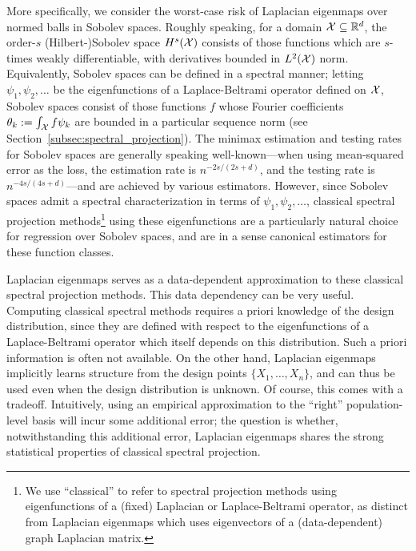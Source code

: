 More specifically, we consider the worst-case risk of Laplacian eigenmaps over normed balls in Sobolev spaces. Roughly speaking, for a domain $\mathcal{X} \subseteq \mathbb{R}^d$, the order-$s$ (Hilbert-)Sobolev space $H^s(\mathcal{X})$ consists of those functions which are $s$-times weakly differentiable, with derivatives bounded in $L^2(\mathcal{X})$ norm. Equivalently, Sobolev spaces can be defined in a spectral manner;  letting $\psi_1,\psi_2,\ldots$ be the eigenfunctions of a Laplace-Beltrami operator defined on $\mathcal{X}$, Sobolev spaces consist of those functions $f$ whose Fourier coefficients $\theta_k := \int_{\mathcal{X}} f \psi_k$ are bounded in a particular sequence norm (see Section~\ref{subsec:spectral_projection}). The minimax estimation and testing rates for Sobolev spaces are generally speaking well-known---when using mean-squared error as the loss, the estimation rate is $n^{-2s/(2s + d)}$, and the testing rate is $n^{-4s/(4s + d)}$---and are achieved by various estimators. However, since Sobolev spaces admit a spectral characterization in terms of $\psi_1,\psi_2,\ldots$, classical spectral projection methods\footnote{We use ``classical'' to refer to spectral projection methods using eigenfunctions of a (fixed) Laplacian or Laplace-Beltrami operator, as distinct from Laplacian eigenmaps which uses eigenvectors of a (data-dependent) graph Laplacian matrix.} using these eigenfunctions are a particularly natural choice for regression over Sobolev spaces, and are in a sense canonical estimators for these function classes. 

Laplacian eigenmaps serves as a data-dependent approximation to these classical spectral projection methods. This data dependency can be very useful. Computing classical spectral methods requires a priori knowledge of the design distribution, since they are defined with respect to the eigenfunctions of a Laplace-Beltrami operator which itself depends on this distribution. Such a priori information is often not available. On the other hand, Laplacian eigenmaps implicitly learns structure from the design points $\{X_1,\ldots,X_n\}$, and can thus be used even when the design distribution is unknown. Of course, this comes with a tradeoff. Intuitively, using an empirical approximation to the ``right'' population-level basis will incur some additional error; the question is whether, notwithstanding this additional error, Laplacian eigenmaps shares the strong statistical properties of classical spectral projection.

